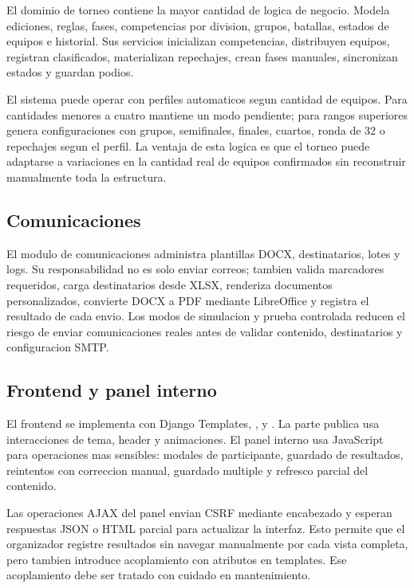 El dominio de torneo contiene la mayor cantidad de logica de negocio. Modela ediciones, reglas, fases, competencias por division, grupos, batallas, estados de equipos e historial. Sus servicios inicializan competencias, distribuyen equipos, registran clasificados, materializan repechajes, crean fases manuales, sincronizan estados y guardan podios.

El sistema puede operar con perfiles automaticos segun cantidad de equipos. Para cantidades menores a cuatro mantiene un modo pendiente; para rangos superiores genera configuraciones con grupos, semifinales, finales, cuartos, ronda de 32 o repechajes segun el perfil. La ventaja de esta logica es que el torneo puede adaptarse a variaciones en la cantidad real de equipos confirmados sin reconstruir manualmente toda la estructura.

\subsection{Comunicaciones}

El modulo de comunicaciones administra plantillas DOCX, destinatarios, lotes y logs. Su responsabilidad no es solo enviar correos; tambien valida marcadores requeridos, carga destinatarios desde XLSX, renderiza documentos personalizados, convierte DOCX a PDF mediante LibreOffice y registra el resultado de cada envio. Los modos de simulacion y prueba controlada reducen el riesgo de enviar comunicaciones reales antes de validar contenido, destinatarios y configuracion SMTP.

\subsection{Frontend y panel interno}

El frontend se implementa con Django Templates, ,  y . La parte publica usa interacciones de tema, header y animaciones. El panel interno usa JavaScript para operaciones mas sensibles: modales de participante, guardado de resultados, reintentos con correccion manual, guardado multiple y refresco parcial del contenido.

Las operaciones AJAX del panel envian CSRF mediante encabezado y esperan respuestas JSON o HTML parcial para actualizar la interfaz. Esto permite que el organizador registre resultados sin navegar manualmente por cada vista completa, pero tambien introduce acoplamiento con atributos  en templates. Ese acoplamiento debe ser tratado con cuidado en mantenimiento.


